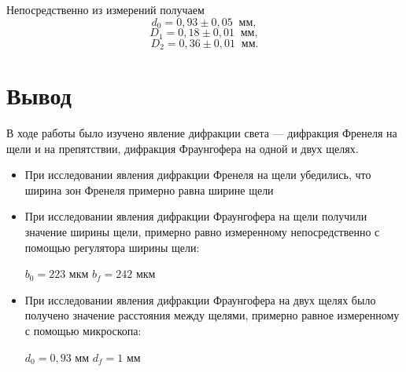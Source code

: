 \documentclass[a4paper]{article}
\begin{document}
\noindent Непосредственно из измерений получаем $$d_0 = 0,93 \pm 0,05 \;\; \text{мм},$$ $$D_1 = 0,18 \pm 0,01\;\; \text{мм},$$ $$D_2 = 0,36 \pm 0,01 \;\; \text{мм}.$$

\section{Вывод}

В ходе работы было изучено явление дифракции света --- дифракция Френеля на щели и на препятствии, дифракция Фраунгофера на одной и двух щелях.

\begin{itemize}
    \item При исследовании явления дифракции Френеля на щели убедились, что ширина зон Френеля примерно равна ширине щели

    \item При исследовании явления дифракции Фраунгофера на щели получили значение ширины щели, примерно равно измеренному непосредственно с помощью регулятора ширины щели:
    \begin{center}
        $b_0 = 223 $ мкм \hspace{1cm} $b_f = 242$ мкм
    \end{center}

    \item При исследовании явления дифракции Фраунгофера на двух щелях было получено значение расстояния между щелями, примерно равное измеренному с помощью микроскопа:
    
    \begin{center}
        $d_0 = 0,93$ мм \hspace{1cm} $d_f = 1$ мм
    \end{center}
\end{itemize}
\end{document}
